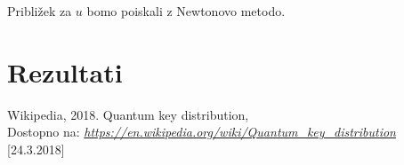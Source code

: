 \documentclass[A4paper, 11pt]{article}
\begin{document}
Približek za $u$ bomo poiskali z Newtonovo metodo.


\section{Rezultati} 




\begin{thebibliography}{9}
	Wikipedia, 2018. Quantum key distribution,  \\
	Dostopno na:
	\textit{\url{https://en.wikipedia.org/wiki/Quantum_key_distribution}}
	[24.3.2018]
\end{thebibliography}
\end{document}
